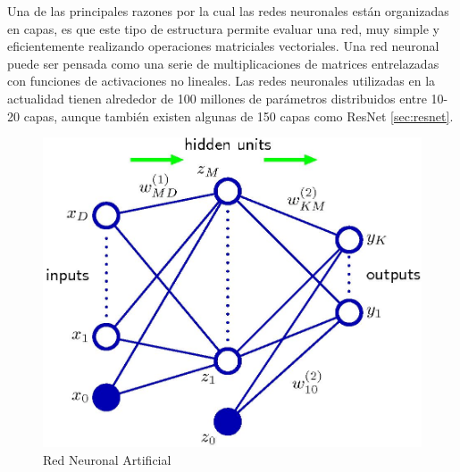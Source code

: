 \documentclass[a4paper,11pt,spanish]{book}
\begin{document}
	Una de las principales razones por la cual las redes neuronales están organizadas en capas, es que este tipo de estructura permite evaluar una red, muy simple y eficientemente 
	realizando operaciones matriciales vectoriales. Una red neuronal puede ser pensada como una serie de multiplicaciones de matrices entrelazadas con funciones de 
	activaciones no lineales.
	Las redes neuronales utilizadas en la actualidad tienen alrededor de 100 millones de parámetros distribuidos entre 10-20 capas, 
	aunque también existen algunas de 150 capas como ResNet \ref{sec:resnet}.

	\begin{figure}[ht]
	  \begin{center}
	    \includegraphics[width=0.8\linewidth]{./img/bishop_neural_network.jpg}
	  \end{center}
	  \caption{Red Neuronal Artificial}
	  \label{fig:neural_network}
	\end{figure}
\end{document}
